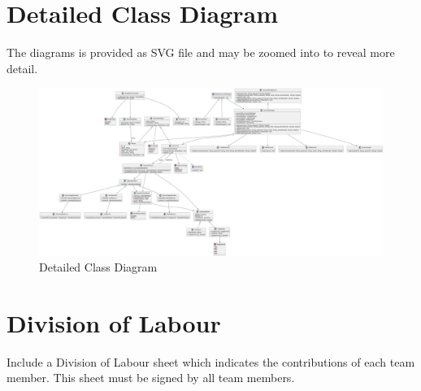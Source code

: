 \documentclass[]{article}
\begin{document}

\clearpage
\section{Detailed Class Diagram}
\label{sec:detailed_class_diagram}
The diagrams is provided as SVG file and may be zoomed into to reveal more detail.
\begin{figure}[h]
    \centering
    \includegraphics[width=\textwidth]{DetailedClassDiagramFinal.pdf}
    \caption{Detailed Class Diagram}
\end{figure}

\clearpage
\appendix
\section{Division of Labour}
\label{sec:division_of_labour}
Include a Division of Labour sheet which indicates the contributions of each team member. This sheet must be signed by all team members.
\end{document}
